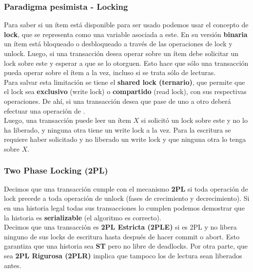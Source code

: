 \subsubsection*{Paradigma pesimista - Locking}
Para saber si un ítem está disponible para ser usado podemos usar el concepto de \textbf{lock}, que se representa como una variable asociada a este. En su versión \textbf{binaria} un ítem está bloqueado o desbloqueado a través de las operaciones de lock y unlock. Luego, si una transacción desea operar sobre un ítem debe solicitar un lock sobre este y esperar a que se lo otorguen. Esto hace que sólo una transacción pueda operar sobre el ítem a la vez, incluso si se trata sólo de lecturas. \\
Para salvar esta limitación se tiene el \textbf{shared lock (ternario)}, que permite que el lock sea \textbf{exclusivo} (write lock) o \textbf{compartido} (read lock), con sus respectivas operaciones. De ahí, si una transacción desea que pase de uno a otro deberá efectuar una operación de . \\
Luego, una transacción puede leer un ítem $X$ si solicitó un lock sobre este y no lo ha liberado, y ninguna otra tiene un write lock a la vez. Para la escritura se requiere haber solicitado y no liberado un write lock y que ninguna otra lo tenga sobre $X$.

\subsubsection*{Two Phase Locking (2PL)}
Decimos que una transacción cumple con el mecanismo \textbf{2PL} si toda operación de lock precede a toda operación de unlock (fases de crecimiento y decrecimiento). Si en una historia legal todas sus transacciones lo cumplen podemos demostrar que la historia es \textbf{serializable} (el algoritmo es correcto). \\
Decimos que una transacción es \textbf{2PL Estricta (2PLE)} si es 2PL y no libera ninguno de sus locks de escritura hasta después de hacer commit o abort. Esto garantiza que una historia sea \textbf{ST} pero no libre de deadlocks. Por otra parte, que sea \textbf{2PL Rigurosa (2PLR)} implica que tampoco los de lectura sean liberados antes.

